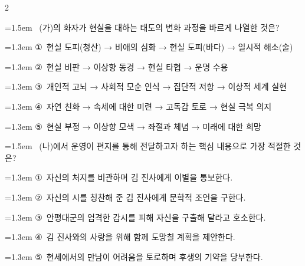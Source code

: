 \documentclass[10pt, a4paper]{article}
\begin{document}
\begin{multicols}{2}
\noindent\begin{minipage}{\columnwidth}
\vspace{2mm}
{\hangindent=1.5em  ~(가)의 화자가 현실을 대하는 태도의 변화 과정을 바르게 나열한 것은?\par}

\vspace{0.5mm}
{\hangindent=1.3em  \noindent\hspace{0.3em}①~현실 도피(청산) → 비애의 심화 → 현실 도피(바다) → 일시적 해소(술)\par}
{\hangindent=1.3em  \noindent\hspace{0.3em}②~현실 비판 → 이상향 동경 → 현실 타협 → 운명 수용\par}
{\hangindent=1.3em  \noindent\hspace{0.3em}③~개인적 고뇌 → 사회적 모순 인식 → 집단적 저항 → 이상적 세계 실현\par}
{\hangindent=1.3em  \noindent\hspace{0.3em}④~자연 친화 → 속세에 대한 미련 → 고독감 토로 → 현실 극복 의지\par}
{\hangindent=1.3em  \noindent\hspace{0.3em}⑤~현실 부정 → 이상향 모색 → 좌절과 체념 → 미래에 대한 희망\par}
\vspace{4mm}
\end{minipage}
\par

\noindent\begin{minipage}{\columnwidth}
\vspace{2mm}
{\hangindent=1.5em  ~(나)에서 운영이 편지를 통해 전달하고자 하는 핵심 내용으로 가장 적절한 것은?\par}

\vspace{0.5mm}
{\hangindent=1.3em  \noindent\hspace{0.3em}①~자신의 처지를 비관하며 김 진사에게 이별을 통보한다.\par}
{\hangindent=1.3em  \noindent\hspace{0.3em}②~자신의 시를 칭찬해 준 김 진사에게 문학적 조언을 구한다.\par}
{\hangindent=1.3em  \noindent\hspace{0.3em}③~안평대군의 엄격한 감시를 피해 자신을 구출해 달라고 호소한다.\par}
{\hangindent=1.3em  \noindent\hspace{0.3em}④~김 진사와의 사랑을 위해 함께 도망칠 계획을 제안한다.\par}
{\hangindent=1.3em  \noindent\hspace{0.3em}⑤~현세에서의 만남이 어려움을 토로하며 후생의 기약을 당부한다.\par}
\vspace{4mm}
\end{minipage}
\par


\end{multicols}
\end{document}
